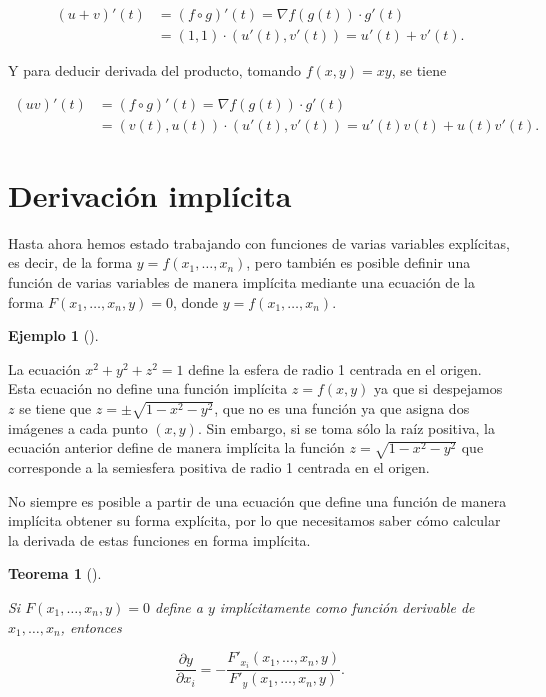 \documentclass[
  a4paper,
]{scrreport}
\theoremstyle{plain}
\theoremstyle{plain}
\newtheorem{theorem}{Teorema}[chapter]
\theoremstyle{definition}
\theoremstyle{definition}
\newtheorem{example}{Ejemplo}[chapter]
\theoremstyle{plain}
\theoremstyle{definition}
\theoremstyle{remark}
\begin{document}
\begin{align*}
(u+v)'(t) 
&= (f\circ g)'(t) = \nabla f(g(t))\cdot g'(t) \\
&= (1,1)\cdot (u'(t),v'(t)) = u'(t)+v'(t).
\end{align*}

Y para deducir derivada del producto, tomando \(f(x,y)=xy\), se tiene

\begin{align*}
(uv)'(t) 
&= (f\circ g)'(t) = \nabla f(g(t))\cdot g'(t) \\
&= (v(t),u(t))\cdot (u'(t),v'(t)) = u'(t)v(t)+u(t)v'(t).
\end{align*}

\hypertarget{derivaciuxf3n-impluxedcita}{%
\section{Derivación implícita}\label{derivaciuxf3n-impluxedcita}}

Hasta ahora hemos estado trabajando con funciones de varias variables
explícitas, es decir, de la forma \(y=f(x_1,\ldots,x_n)\), pero también
es posible definir una función de varias variables de manera implícita
mediante una ecuación de la forma \(F(x_1,\ldots,x_n, y)=0\), donde
\(y=f(x_1,\ldots,x_n)\).

\begin{example}[]\protect\hypertarget{exm-funcion-implicita-2-variables}{}\label{exm-funcion-implicita-2-variables}

La ecuación \(x^2+y^2+z^2 = 1\) define la esfera de radio 1 centrada en
el origen. Esta ecuación no define una función implícita \(z=f(x,y)\) ya
que si despejamos \(z\) se tiene que \(z=\pm\sqrt{1-x^2-y^2}\), que no
es una función ya que asigna dos imágenes a cada punto \((x,y)\). Sin
embargo, si se toma sólo la raíz positiva, la ecuación anterior define
de manera implícita la función \(z=\sqrt{1-x^2-y^2}\) que corresponde a
la semiesfera positiva de radio 1 centrada en el origen.

\end{example}

No siempre es posible a partir de una ecuación que define una función de
manera implícita obtener su forma explícita, por lo que necesitamos
saber cómo calcular la derivada de estas funciones en forma implícita.

\begin{theorem}[]\protect\hypertarget{thm-derivada-implicita-funcion-varias-variables}{}\label{thm-derivada-implicita-funcion-varias-variables}

Si \(F(x_1,\ldots,x_n,y)=0\) define a \(y\) implícitamente como función
derivable de \(x_1,\ldots,x_n\), entonces

\[
\frac{\partial y}{\partial x_i} = -\frac{F'_{x_i}(x_1,\ldots,x_n,y)}{F'_{y}(x_1,\ldots,x_n,y)}.
\]

\end{theorem}
\end{document}
